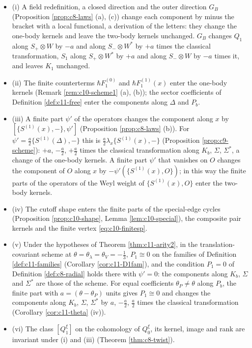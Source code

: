 \begin{proposition}
\label{prop:c11-freedom}
\begin{itemize}
\item (i) A field redefinition, a closed direction and the outer direction $G_B$ (Proposition \ref{prop:c8-laws} (a), (c)) change each component by minus the bracket with a local functional, a derivation of the letters: they change the one-body kernels and leave the two-body kernels unchanged. $G_B$ changes $Q_1$ along $S_+\otimes W$ by $-a$ and along $S_-\otimes W^*$ by $+a$ times the classical transformation, $S_1$ along $S_+\otimes W^*$ by $+a$ and along $S_-\otimes W$ by $-a$ times it, and leaves $K_1$ unchanged.
\item (ii) The finite counterterms $\hbar F_1^{(0)}$ and $\hbar F_1^{(1)}(x)$ enter the one-body kernels (Remark \ref{rem:c10-scheme1} (a), (b)); the sector coefficients of Definition \ref{def:c11-free} enter the components along $\Delta$ and $P_b$.
\item (iii) A finite part $\psi'$ of the operators changes the component along $x$ by $[\{S^{(1)}(x),-\},\psi']$ (Proposition \ref{prop:c8-laws} (b)). For $\psi'=\tfrac a2\{S^{(1)}(\Delta),-\}$ this is $\tfrac a2\lambda_x\{S^{(1)}(x),-\}$ (Proposition \ref{prop:c9-scheme}): $+a$, $-\tfrac a2$, $+\tfrac a2$ times the classical transformation along $K_b$, $\Sigma$, $\Sigma^*$, a change of the one-body kernels. A finite part $\psi'$ that vanishes on $O$ changes the component of $O$ along $x$ by $-\psi'(\{S^{(1)}(x),O\})$; in this way the finite parts of the operators of the Weyl weight of $\{S^{(1)}(x),O\}$ enter the two-body kernels.
\item (iv) The cutoff shape enters the finite parts of the special-edge cycles (Proposition \ref{prop:c10-shape}, Lemma \ref{lem:c10-special}), the composite pair kernels and the finite vertex \eqref{eq:c10-finitesp}.
\item (v) Under the hypotheses of Theorem \ref{thm:c11-arity2}, in the translation-covariant scheme at $\theta=\theta_\lambda=\theta_V=-\tfrac13$, $P_1\cong0$ on the families of Definition \ref{def:c11-families} (Corollary \ref{cor:c11-D1fam}), and the condition $P_1=0$ of Definition \ref{def:c8-radial} holds there with $\psi'=0$: the components along $K_b$, $\Sigma$ and $\Sigma^*$ are those of the scheme. For equal coefficients $\theta_P\ne\theta$ along $P_b$, the finite part with $a=(\theta-\theta_P)$ units gives $P_1\cong0$ and changes the components along $K_b$, $\Sigma$, $\Sigma^*$ by $a$, $-\tfrac a2$, $\tfrac a2$ times the classical transformation (Corollary \ref{cor:c11-theta} (iv)).
\item (vi) The class $[Q^\xi_1]$ on the cohomology of $Q^\xi_0$, its kernel, image and rank are invariant under (i) and (iii) (Theorem \ref{thm:c8-twist}).
\end{itemize}
\end{proposition}

